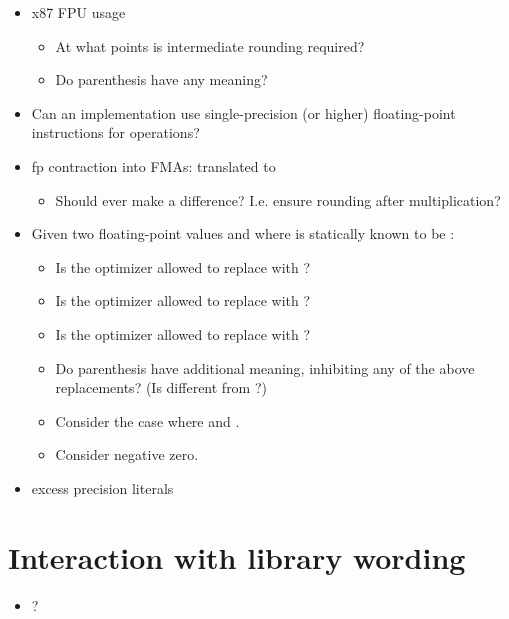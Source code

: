 \begin{itemize}
  \item x87 FPU usage
    \begin{itemize}
      \item At what points is intermediate rounding required?
      \item Do parenthesis have any meaning?
    \end{itemize}

  \item Can an implementation use single-precision (or higher) floating-point
    instructions for  operations?

  \item fp contraction into FMAs:  translated to 
    \begin{itemize}
      \item Should  ever make a difference?
        I.e. ensure rounding after multiplication?
    \end{itemize}

  \item Given two floating-point values  and  where  is statically known to be :
    \begin{itemize}
      \item Is the optimizer allowed to replace  with ?
      \item Is the optimizer allowed to replace  with ?
      \item Is the optimizer allowed to replace  with ?
      \item Do parenthesis have additional meaning, inhibiting any of the above replacements?
        (Is  different from ?)
      \item Consider the case where  and .
      \item Consider negative zero.
    \end{itemize}

  \item excess precision literals
\end{itemize}

\section{Interaction with library wording}

\begin{itemize}
  \item {}?
\end{itemize}


